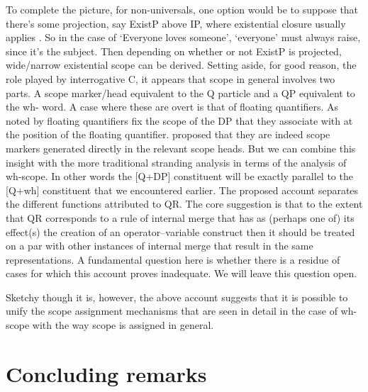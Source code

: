\documentclass[charis]{glossa}
\begin{document}
To complete the picture, for non-universals, one option would be to  suppose that there's some projection, say ExistP above IP, where existential closure usually applies \citep{kratzer:2005}. So in the case of  `Everyone loves someone', `everyone' must always raise, since it's the subject. Then depending on whether or not ExistP is projected,  wide/narrow existential scope can be derived.  Setting aside, for good reason, the role played by interrogative C, it appears that scope in general involves two parts.  A scope marker/head equivalent to the Q particle and a QP equivalent to the wh- word.  A case where these are overt is that of floating quantifiers.  As noted by \citet{dowty-brodie:84} floating quantifiers fix the scope of the DP that they associate with at the position of the floating quantifier.  \citet{tsoulas:2003} proposed that they are indeed scope markers generated directly in the relevant scope heads.  But we can combine this insight with the more traditional stranding analysis in terms of the analysis of wh-scope.  In other words the [Q+DP] constituent will be exactly parallel to the [Q+wh] constituent that we encountered earlier.
The proposed account separates the different functions attributed to QR. The core suggestion is that to the extent that QR corresponds to a rule of internal merge that has as (perhaps one of) its effect(s) the creation of an operator--variable construct then it should be treated on a par with other instances of internal merge that result in the same representations.  A fundamental question here is whether there is a residue of cases for which this account proves inadequate. We will leave this question open.

Sketchy though it is, however, the above account suggests that it is possible to unify the scope assignment mechanisms that are seen in detail in the case of wh- scope with the way scope is assigned in general.

\section{Concluding remarks}
\end{document}

